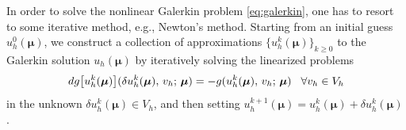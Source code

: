 \documentclass[12pt, a4paper, twoside, openright, notitlepage]{report}
\numberwithin{equation}{chapter}
\theoremstyle{theorem}
\theoremstyle{definition}
\theoremstyle{remark}
\theoremstyle{proposition}
\numberwithin{figure}{chapter}
\newcommand{\bg}[1]{\boldsymbol{#1}}
\begin{document}
		In order to solve the nonlinear Galerkin problem \eqref{eq:galerkin}, one has to resort to some iterative method, e.g., Newton's method. Starting from an initial guess $u_h^0(\bg{\mu})$, we construct a collection of approximations $\big\lbrace u_h^k(\bg{\mu}) \big\rbrace_{k \geq 0}$ to the Galerkin solution $u_h(\bg{\mu})$ by iteratively solving the linearized problems
		\begin{equation*}
			\label{eq:newton-linearized-problem}
			dg \big[ u_h^k(\bg{\mu}) \big](\delta u_h^k(\bg{\mu}), \, v_h; \, \bg{\mu}) = - g(u_h^k(\bg{\mu}), \, v_h; \, \bg{\mu}) \hspace*{0.3cm} \forall v_h \in V_h
		\end{equation*}
		in the unknown $\delta u_h^k(\bg{\mu}) \in V_h$, and then setting $u_h^{k+1}(\bg{\mu}) = u_h^k(\bg{\mu}) + \delta u_h^k(\bg{\mu})$. 
		
\end{document}

